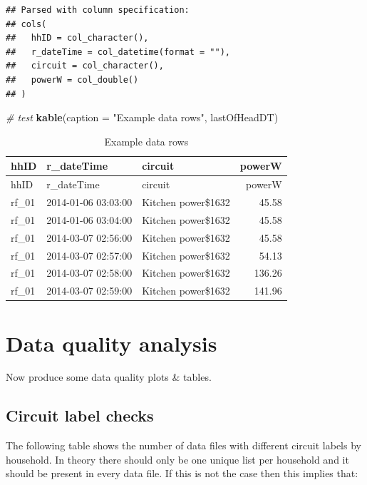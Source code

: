 \documentclass[]{article}
\newenvironment{Shaded}{\begin{snugshade}}{\end{snugshade}}
\newcommand{\KeywordTok}[1]{\textcolor[rgb]{0.13,0.29,0.53}{\textbf{#1}}}
\newcommand{\DataTypeTok}[1]{\textcolor[rgb]{0.13,0.29,0.53}{#1}}
\newcommand{\StringTok}[1]{\textcolor[rgb]{0.31,0.60,0.02}{#1}}
\newcommand{\CommentTok}[1]{\textcolor[rgb]{0.56,0.35,0.01}{\textit{#1}}}
\newcommand{\NormalTok}[1]{#1}
\begin{document}
\begin{verbatim}
## Parsed with column specification:
## cols(
##   hhID = col_character(),
##   r_dateTime = col_datetime(format = ""),
##   circuit = col_character(),
##   powerW = col_double()
## )
\end{verbatim}

\begin{Shaded}
\begin{Highlighting}[]
\CommentTok{# test}
\KeywordTok{kable}\NormalTok{(}\DataTypeTok{caption =} \StringTok{"Example data rows"}\NormalTok{, lastOfHeadDT)}
\end{Highlighting}
\end{Shaded}

\begin{longtable}[]{@{}lllr@{}}
\caption{Example data rows}\tabularnewline
\toprule
hhID & r\_dateTime & circuit & powerW\tabularnewline
\midrule
\endfirsthead
\toprule
hhID & r\_dateTime & circuit & powerW\tabularnewline
\midrule
\endhead
rf\_01 & 2014-01-06 03:03:00 & Kitchen power\$1632 &
45.58\tabularnewline
rf\_01 & 2014-01-06 03:04:00 & Kitchen power\$1632 &
45.58\tabularnewline
rf\_01 & 2014-03-07 02:56:00 & Kitchen power\$1632 &
45.58\tabularnewline
rf\_01 & 2014-03-07 02:57:00 & Kitchen power\$1632 &
54.13\tabularnewline
rf\_01 & 2014-03-07 02:58:00 & Kitchen power\$1632 &
136.26\tabularnewline
rf\_01 & 2014-03-07 02:59:00 & Kitchen power\$1632 &
141.96\tabularnewline
\bottomrule
\end{longtable}

\section{Data quality analysis}\label{data-quality-analysis}

Now produce some data quality plots \& tables.

\subsection{Circuit label checks}\label{circuit-label-checks}

The following table shows the number of data files with different
circuit labels by household. In theory there should only be one unique
list per household and it should be present in every data file. If this
is not the case then this implies that:
\end{document}
